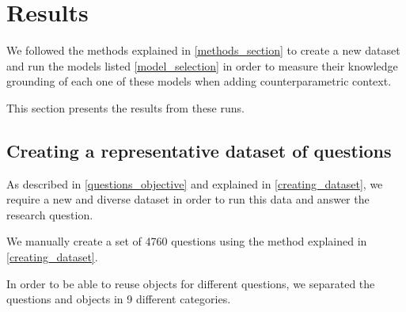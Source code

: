 \section{Results}
\label{results_section}

We followed the methods explained in \cref{methods_section} to create a new dataset and run the models listed \cref{model_selection} in order to measure their knowledge grounding of each one of these models when adding counterparametric context.

This section presents the results from these runs.

\subsection{Creating a representative dataset of questions}
\label{dataset_results}

As described in \cref{questions_objective} and explained in \cref{creating_dataset}, we require a new and diverse dataset in order to run this data and answer the research question.

We manually create a set of 4760 questions using the method explained in \cref{creating_dataset}.

In order to be able to reuse objects for different questions, we separated the questions and objects in 9 different categories.

